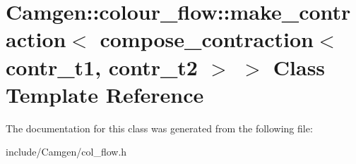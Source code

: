 \hypertarget{a00339}{\section{Camgen\-:\-:colour\-\_\-flow\-:\-:make\-\_\-contraction$<$ compose\-\_\-contraction$<$ contr\-\_\-t1, contr\-\_\-t2 $>$ $>$ Class Template Reference}
\label{a00339}
}


The documentation for this class was generated from the following file\-:\begin{DoxyCompactItemize}
\item 
include/\-Camgen/col\-\_\-flow.\-h\end{DoxyCompactItemize}
